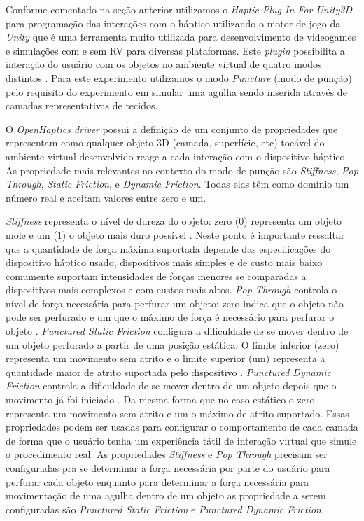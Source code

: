 Conforme comentado na seção anterior utilizamos o \textit{Haptic Plug-In For Unity3D} para programação das interações com o háptico utilizando o motor de jogo da \textit{Unity} \cite{UnityTechnologies2020} que é uma ferramenta muito utilizada para desenvolvimento de videogames e simulações com e sem \acrshort{RV} para diversas plataformas.
Este \textit{plugin} possibilita a interação do usuário com os objetos no ambiente virtual  de quatro modos distintos \cite{Poyade2014}. Para este experimento utilizamos o modo \textit{Puncture} (modo de punção) pelo requisito do experimento em simular uma agulha sendo inserida através de camadas representativas de tecidos.

O \textit{OpenHaptics driver} possui a definição de um conjunto de propriedades que representam como qualquer objeto 3D (camada, superfície, etc) tocável do ambiente virtual desenvolvido reage a cada interação com o dispositivo háptico. As propriedade mais relevantes no contexto do modo de punção são \textit{Stiffness}, \textit{Pop Through}, \textit{Static Friction}, e \textit{Dynamic Friction}. Todas elas têm como domínio um número real e aceitam valores entre zero e um. 

\textit{Stiffness} representa o nível de dureza do objeto: zero (0) representa um objeto mole e um (1) o objeto mais duro possível \cite{3DSystemsTouch2018}. Neste ponto é importante ressaltar que a quantidade de força máxima suportada depende das especificações do dispositivo háptico usado, dispositivos mais simples e de custo mais baixo comumente suportam intensidades de forças menores se comparadas a dispositivos mais complexos e com custos mais altos. \textit{Pop Through} controla o nível de força necessária para perfurar um objeto: zero indica que o objeto não pode ser perfurado e um que o máximo de força é necessário para perfurar o objeto \cite{3DSystemsTouch2018}. \textit{Punctured Static Friction} configura a dificuldade de se mover dentro de um objeto perfurado a partir de uma posição estática. O limite inferior (zero) representa um movimento sem atrito e o limite superior (um) representa a quantidade maior de atrito suportada pelo dispositivo \cite{3DSystemsTouch2018}. \textit{Punctured Dynamic Friction} controla a dificuldade de se mover dentro de um objeto depois que o movimento já foi iniciado \cite{3DSystemsTouch2018}. Da mesma forma que no caso estático o zero representa um movimento sem atrito e um o máximo de atrito suportado. Essas propriedades podem ser usadas para configurar o comportamento de cada camada de forma que o usuário tenha um experiência tátil de interação virtual que simule o procedimento real. As propriedades \textit{Stiffness} e \textit{Pop Through} precisam ser configuradas pra se determinar a força necessária por parte do usuário para perfurar cada objeto enquanto para determinar a força necessária para movimentação de uma agulha dentro de um objeto as propriedade a serem configuradas são \textit{Punctured Static Friction} e \textit{Punctured Dynamic Friction}.

